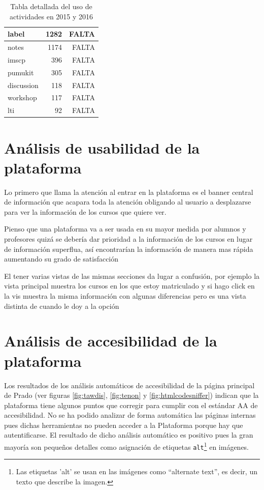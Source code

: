 \begin{table}[H]
\begin{tabular}{|l|r|r|}
label           & 1282          & FALTA         \\ \hline
notes           & 1174          & FALTA         \\ \hline
imscp           & 396           & FALTA         \\ \hline
pumukit         & 305           & FALTA         \\ \hline
discussion      & 118           & FALTA         \\ \hline
workshop        & 117           & FALTA         \\ \hline
lti             & 92            & FALTA         \\ \hline
\end{tabular}
\caption{Tabla detallada del uso de actividades en 2015 y 2016}
\label{table:usoactividades_2015}
\end{table}




\section{Análisis de usabilidad de la plataforma}


Lo primero que llama la atención al entrar en la plataforma es el banner central de información que acapara toda la atención obligando al usuario a desplazarse para ver la información de los cursos que quiere ver.

\bigskip
Pienso que una plataforma va a ser usada en su mayor medida por alumnos y profesores quizá se debería dar prioridad a la información de los cursos en lugar de información superflua, así encontrarían la información de manera mas rápida aumentando su grado de satisfacción

\bigskip
El tener varias vistas de las mismas secciones da lugar a confusión, por ejemplo la vista principal muestra los cursos en los que estoy matriculado y si hago click en la vis muestra la misma información con algunas diferencias pero es una vista distinta de cuando le doy a la opción 

\section{Análisis de accesibilidad de la plataforma}

Los resultados de los análisis automáticos de accesibilidad de la página principal de Prado (ver figuras \ref{fig:tawdis}, \ref{fig:tenon} y \ref{fig:htmlcodesniffer}) indican que la plataforma tiene algunos puntos que corregir para cumplir con el estándar AA de accesibilidad. No se ha podido analizar de forma automática las páginas internas pues dichas herramientas no pueden acceder a la Plataforma porque hay que autentificarse. El resultado de dicho análisis automático es positivo pues la gran mayoría son pequeños detalles como asignación de etiquetas \texttt{alt}\footnote{Las etiquetas 'alt' se usan en las imágenes como “alternate text”, es decir, un texto que describe la imagen.} en imágenes. 

